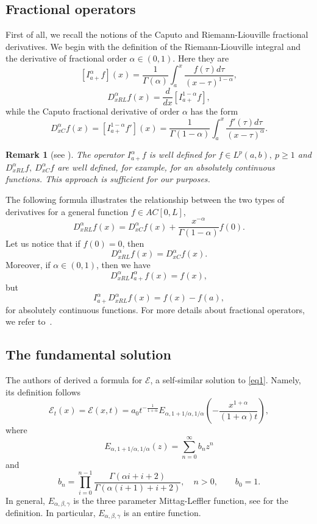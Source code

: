 \documentclass{article}
\newtheorem{remark}{Remark}
\def\sE{{\mathscr{E}}}
\begin{document}
\subsection{Fractional operators}
First of all, we  recall the notions of the  Caputo and Riemann-Liouville fractional derivatives. We begin with the definition of the Riemann-Liouville integral and the derivative of fractional order $\alpha\in (0,1)$. Here they are 
$$[I^{\alpha}_{a+}f](x)=\frac{1}{\Gamma(\alpha)}\int_a^x{\frac{f(\tau)d\tau}{(x-\tau)^{1-\alpha}}},$$
$$D^{\alpha}_{xRL}f(x)=\frac{d}{dx}[I^{1-\alpha}_{a+}f],$$
while the Caputo fractional derivative of order $\alpha$ has the form
$$D^{\alpha}_{xC}f(x)=[I^{1-\alpha}_{a+}f'](x)=\frac{1}{\Gamma(1-\alpha)}\int_a^x{\frac{f'(\tau)d\tau}{(x-\tau)^{\alpha}}}.$$
\begin{remark}[see \cite{Kilbas}]
The operator $I^{\alpha}_{a+}f$ is well defined for $f\in L^p(a,b),\ p\geq 1$ and $D^{\alpha}_{xRL}f,\ D^{\alpha}_{xC}f$ are well defined, for example, for an absolutely continuous functions. This approach is sufficient for our purposes.
\end{remark}

The following formula illustrates the relationship between the two types of derivatives for a general function $f\in AC[0,L]$,
$$D^{\alpha}_{xRL}f(x)=D^{\alpha}_{xC}f(x)+\frac{x^{-\alpha}}{\Gamma(1-\alpha)}f(0).$$
Let us notice that if $f(0)=0$, then 
$$D^{\alpha}_{xRL}f(x)=D^{\alpha}_{xC}f(x).$$
Moreover, if $\alpha\in (0,1)$, then  we have
$$D^{\alpha}_{xRL}I^\alpha _{a+}f(x)=f(x),$$
but
\begin{equation}\label{r-ID}
I^\alpha _{a+}D^{\alpha}_{xRL}f(x)=f(x)-f(a)    ,
\end{equation}
for absolutely continuous %
functions. %
For more details about fractional operators, we refer to~\cite{Kilbas}.

\subsection{The fundamental solution}
The authors of \cite{NRS} derived a formula for $\sE$, a self-similar solution to \eqref{eq1}. Namely, its definition follows
\begin{equation}
       \sE_t(x) = \sE(x,t)=a_0t^{-\frac{1}{1+\alpha}}E_{\alpha,1+1/\alpha,1/\alpha}\left(-\frac{x^{1+\alpha}}{(1+\alpha)t}\right),
   \end{equation}
where
$$
E_{\alpha, 1+1/\alpha, 1/\alpha} (z)= \sum_{n=0}^\infty  b_n z^n
$$
and
\begin{equation*}%
    b_n = \prod_{i=0}^{n-1} \frac{\Gamma(\alpha i + i +2)}{\Gamma(\alpha(i+1) + i +2)}, \quad n>0, \qquad b_0=1.
\end{equation*}
In general, 
$E_{\alpha, \beta, \gamma}$ is the three parameter Mittag-Leffler function, see \cite[formula (1.9.19)]{Kilbas} for the definition. In particular, $E_{\alpha, \beta, \gamma}$ is an entire function.
\end{document}
